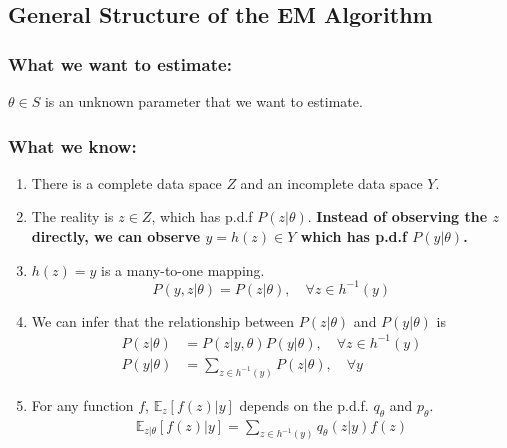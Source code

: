 \documentclass[11pt,a4paper]{article}
\begin{document}
\subsection{General Structure of the EM Algorithm}

\subsubsection*{What we want to estimate:}
$\theta\in S$ is an unknown parameter that we want to estimate.
\subsubsection*{What we know:}
\begin{enumerate}
    \item There is a complete data space $Z$ and an incomplete data space $Y$.
    \item The reality is $z\in Z$, which has p.d.f $P(z|\theta)$. \textbf{Instead of observing the $z$ directly, we can observe $y=h(z)\in Y$ which has p.d.f $P(y|\theta)$.}
    \item $h(z)=y$ is a many-to-one mapping. $$P(y,z|\theta)=P(z|\theta),\quad \forall z\in h^{-1}(y)$$
    \item We can infer that the relationship between $P(z|\theta)$ and $P(y|\theta)$ is
    \begin{equation}
        \begin{aligned}
            P(z|\theta)&=P(z|y,\theta)P(y|\theta),\quad \forall z\in h^{-1}(y)\\
            P(y|\theta)&=\sum_{z\in h^{-1}(y)}P(z|\theta),\quad \forall y
        \end{aligned}
        \nonumber
    \end{equation}
    \item For any function $f$, $\mathbb{E}_z[f(z)|y]$ depends on the p.d.f. $q_\theta$ and $p_\theta$. \begin{equation}
        \begin{aligned}
            \mathbb{E}_{z|\theta}[f(z)|y]=\sum_{z\in h^{-1}(y)}q_\theta(z|y)f(z)
        \end{aligned}
        \nonumber
    \end{equation}
\end{enumerate}
\end{document}
